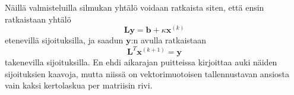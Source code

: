 \documentclass{article}
\begin{document}
Näillä valmisteluilla silmukan yhtälö voidaan ratkaista siten,
että ensin ratkaistaan yhtälö
\[
  \mathbf{L}\mathbf{y} = \mathbf{b} + \kappa \mathbf{x}^{(k)}
\]
etenevillä sijoituksilla, ja saadun $\mathbf{y}$:n avulla ratkaistaan
\[
  \mathbf{L}^T\mathbf{x}^{(k+1)} = \mathbf{y}
\]
takenevilla sijoituksilla. En ehdi aikarajan puitteissa kirjoittaa
auki näiden sijoituksien kaavoja, mutta niissä on 
vektorimuotoisen tallennustavan ansiosta vain kaksi kertolaskua per matriisin rivi.
\end{document}
